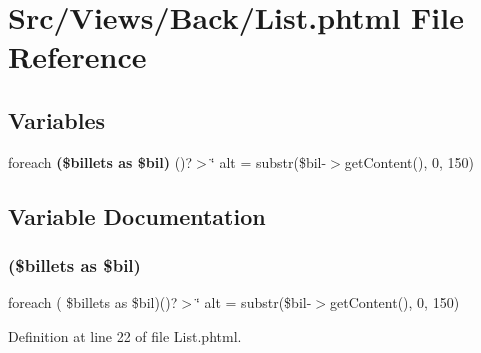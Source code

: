 \section{Src/\+Views/\+Back/\+List.phtml File Reference}
\label{_back_2_list_8phtml}
\subsection*{Variables}
\begin{DoxyCompactItemize}
\item 
foreach \textbf{ (\$billets as \$bil)} ()?$>$\char`\"{} alt = substr(\$bil-\/$>$get\+Content(), 0, 150)
\end{DoxyCompactItemize}


\subsection{Variable Documentation}
\mbox{\label{_back_2_list_8phtml_a1f60df41da29a5ab6912652ef3c1cea5}} 
\subsubsection{(\$billets as \$bil)}
{\footnotesize\ttfamily foreach ( \$billets as \$bil)()?$>$\char`\"{} alt = substr(\$bil-\/$>$get\+Content(), 0, 150)}



Definition at line 22 of file List.\+phtml.

